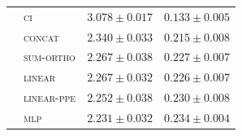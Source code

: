 \begin{table}[t]
\begin{tabular}{llcc}
    & \textsc{ci}         & $3.078 \pm 0.017$ & $0.133 \pm 0.005$ \\
    & \textsc{concat}     & $2.340 \pm 0.033$ & $0.215 \pm 0.008$ \\
    & \textsc{sum-ortho}  & $2.267 \pm 0.038$ & $0.227 \pm 0.007$ \\
    & \textsc{linear}     & $2.267 \pm 0.032$ & $0.226 \pm 0.007$ \\
    & \textsc{linear-ppe} & $2.252 \pm 0.038$ & $0.230 \pm 0.008$ \\
    & \textsc{mlp}        & $2.231 \pm 0.032$ & $0.234 \pm 0.004$ \\
\bottomrule
\end{tabular}
\end{table}
